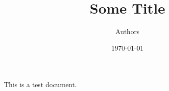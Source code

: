 \documentclass[a4paper, 10pt]{article}
\title{Some Title}
\author{Authors}
\date{\today}
\begin{document}
This is a test document.
\end{document}
